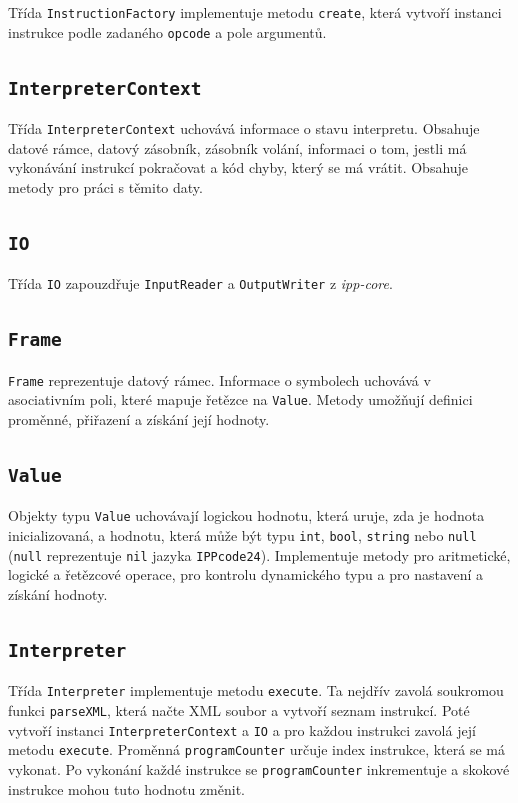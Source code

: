 \documentclass[11pt, letterpaper]{article}
\begin{document}
Třída \texttt{InstructionFactory} implementuje metodu \texttt{create}, která vytvoří instanci instrukce podle zadaného \texttt{opcode} a pole argumentů.

\subsection{\texttt{InterpreterContext}}

Třída \texttt{InterpreterContext} uchovává informace o stavu interpretu. Obsahuje datové rámce, datový zásobník, zásobník volání, informaci o tom, jestli má vykonávání instrukcí pokračovat a kód chyby, který se má vrátit. Obsahuje metody pro práci s těmito daty.

\subsection{\texttt{IO}}

Třída \texttt{IO} zapouzdřuje \texttt{InputReader} a \texttt{OutputWriter} z \textit{ipp-core}.

\subsection{\texttt{Frame}}

\texttt{Frame} reprezentuje datový rámec. Informace o symbolech uchovává v asociativním poli, které mapuje řetězce na \texttt{Value}. Metody umožňují definici proměnné, přiřazení a získání její hodnoty.

\subsection{\texttt{Value}}

Objekty typu \texttt{Value} uchovávají logickou hodnotu, která uruje, zda je hodnota inicializovaná, a hodnotu, která může být typu \texttt{int}, \texttt{bool}, \texttt{string} nebo \texttt{null} (\texttt{null} reprezentuje \texttt{nil} jazyka \texttt{IPPcode24}). Implementuje metody pro aritmetické, logické a řetězcové operace, pro kontrolu dynamického typu a pro nastavení a získání hodnoty.

\subsection{\texttt{Interpreter}}

Třída \texttt{Interpreter} implementuje metodu \texttt{execute}. Ta nejdřív zavolá soukromou funkci \texttt{parseXML}, která načte XML soubor a vytvoří seznam instrukcí. Poté vytvoří instanci \texttt{InterpreterContext} a \texttt{IO} a pro každou instrukci zavolá její metodu \texttt{execute}. Proměnná \texttt{programCounter} určuje index instrukce, která se má vykonat. Po vykonání každé instrukce se \texttt{programCounter} inkrementuje a skokové instrukce mohou tuto hodnotu změnit.
\end{document}
